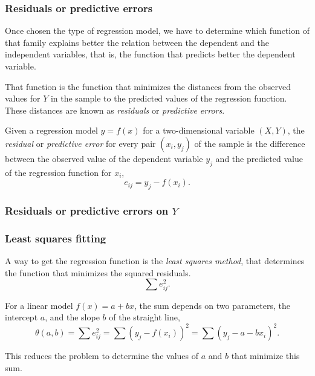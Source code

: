 \begin{frame}
\frametitle{Residuals or predictive errors}
Once chosen the type of regression model, we have to determine which function of that family explains better the
relation between the dependent and the independent variables, that is, the function that predicts better the
dependent variable. 

That function is the function that minimizes the distances from the observed values for $Y$ in the sample to the
predicted values of the regression function.
These distances are known as \emph{residuals} or \emph{predictive errors}.

\begin{definition}
Given a regression model $y=f(x)$ for a two-dimensional variable $(X,Y)$, the \emph{residual} or \emph{predictive error}
for every pair $(x_i,y_j)$ of the sample is the difference between the observed value of the dependent variable $y_j$
and the predicted value of the regression function for $x_i$,
\[
e_{ij} = y_j-f(x_i).
\]
\end{definition}
\end{frame}


\begin{frame}
\frametitle{Residuals or predictive errors on $Y$}
\centering
{}
\end{frame}


\begin{frame}
\frametitle{Least squares fitting}
A way to get the regression function is the \emph{least squares method}, that determines the function that minimizes the squared residuals.
\[
\sum e_{ij}^2.
\]

For a linear model $f(x) = a + bx$, the sum depends on two parameters, the intercept $a$, and the slope $b$ of the
straight line,
\[
\theta(a,b) = \sum e_{ij}^2 =\sum (y_j - f(x_i))^2 =\sum (y_j-a-bx_i)^2.
\]

This reduces the problem to determine the values of $a$ and $b$ that minimize this sum. 
\end{frame}


